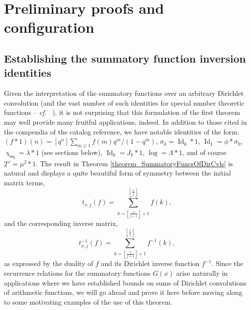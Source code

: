 \documentclass[11pt,reqno,a4letter]{article}
\numberwithin{figure}{section}
\numberwithin{table}{section}
\newcommand{\cf}{\textit{cf.\ }}
\newcommand{\floor}[1]{\left\lfloor #1 \right\rfloor}
\renewcommand{\chi}{\upchi}
\theoremstyle{plain}
\numberwithin{theorem}{section}
\theoremstyle{definition}
\begin{document}
\newpage 
\section{Preliminary proofs and configuration} 
\label{Section_PrelimProofs_Config} 

\subsection{Establishing the summatory function inversion identities} 

Given the interpretation of the summatory functions over an arbitrary Dirichlet convolution 
(and the vast number of such identities for special number theoretic functions -- \cf 
\cite{CATALOG-INTDIRSERIES,CATALOG-LAMBERTSERIES}), it is not surprising that this formulation of the first theorem 
may well provide many fruitful applications, indeed. In addition to those cited in the 
compendia of the catalog reference, we have notable identities of the form: 
$(f \ast 1)(n) = [q^n] \sum_{m \geq 1} f(m) q^m / (1-q^m)$, 
$\sigma_k = \operatorname{Id}_k \ast 1$, $\operatorname{Id}_1 = \phi \ast \sigma_0$, 
$\chi_{\operatorname{sq}} = \lambda \ast 1$ (see sections below), 
$\operatorname{Id}_k = J_k \ast 1$, $\log = \Lambda \ast 1$, and of course 
$2^{\omega} = \mu^2 \ast 1$. 
The result in Theorem \ref{theorem_SummatoryFuncsOfDirCvls} is 
natural and displays a quite beautiful form of symmetry between the 
initial matrix terms, $$t_{x,j}(f) = \sum_{k=\floor{\frac{x}{j+1}}+1}^{\floor{\frac{x}{j}}} f(k),$$ and the 
corresponding inverse matrix, $$t_{x,j}^{-1}(f) = \sum_{k=\floor{\frac{x}{j+1}}+1}^{\floor{\frac{x}{j}}} f^{-1}(k),$$ 
as expressed by the duality of $f$ and its Dirichlet inverse function $f^{-1}$. Since the recurrence relations for the 
summatory functions $G(x)$ arise naturally in applications where we have established bounds on sums of 
Dirichlet convolutions of arithmetic functions, we will go ahead and prove it here before moving along to some 
motivating examples of the use of this theorem. 
\end{document}
